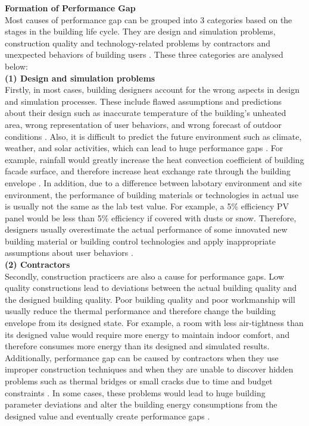\documentclass[a4paper, oneside]{discothesis}
\begin{document}
	\textbf{Formation of Performance Gap}\\
		Most causes of performance gap can be grouped into 3 categories based on the stages in the building life cycle. They are design and simulation problems, construction quality and technology-related problems by contractors and unexpected behaviors of building users \cite{userevaluations,NIU2016275}. These three categories are analysed below:\\
		
		\textbf{(1) Design and simulation problems}\\
		Firstly, in most cases, building designers account for the wrong aspects in design and simulation processes. These include flawed assumptions and predictions about their design such as inaccurate temperature of the building's unheated area, wrong representation of user behaviors, and wrong forecast of outdoor conditions \cite{NIU2016275,HOFFMANN201731}. Also, it is difficult to predict the future environment such as climate, weather, and solar activities, which can lead to huge performance gaps \cite{DIAZ2017393,doi:10.1080/19401493.2012.718797}. For example, rainfall would greatly increase the heat convection coefficient of building facade surface, and therefore increase heat exchange rate through the building envelope \cite{DIAZ2017393}. In addition, due to a difference between labotary environment and site environment, the performance of building materials or technologies in actual use is usually not the same as the lab test value. For example, a 5\% efficiency PV panel would be less than 5\% efficiency if covered with dusts or snow. Therefore, designers usually overestimate the actual performance of some innovated new building material or building control technologies and apply inappropriate assumptions about user behaviors \cite{DEWILDE201440}. \\

		\textbf{(2) Contractors}\\
		Secondly, construction practicers are also a cause for performance gaps. Low quality constructions lead to deviations between the actual building quality and the designed building quality. Poor building quality and poor workmanship will usually reduce the thermal performance and therefore change the building envelope from its designed state. For example, a room with less air-tightness than its designed value would require more energy to maintain indoor comfort, and therefore consumes more energy than its designed and simulated results. Additionally, performance gap can be caused by contractors when they use improper construction techniques and when they are unable to discover hidden problems such as thermal bridges or small cracks due to time and budget constraints \cite{DEWILDE201440}. In some cases, these problems would lead to huge building parameter deviations and alter the building energy consumptions from the designed value and eventually create performance gaps \cite{FREI2017421,DEWILDE201440}.\\ 
\end{document}
